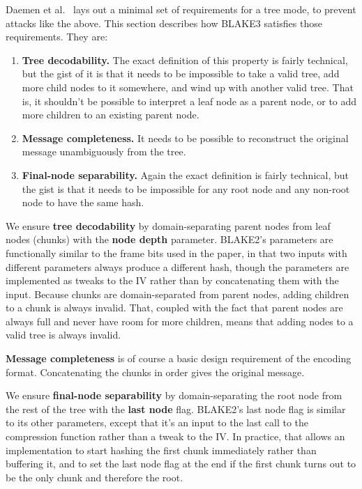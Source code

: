 \documentclass[11pt,notitlepage,a4paper]{article}
\newcommand{\name}{BLAKE3\xspace}
\begin{document}
Daemen et al.~\cite{DBLP:journals/ijisec/BertoniDPA14,DBLP:journals/tosc/DaemenMA18} lays out a minimal set of requirements for a tree mode, to prevent attacks like the above. This section describes how \name satisfies those requirements. They are:
\begin{enumerate}
\item \textbf{Tree decodability.} The exact definition of this property is fairly technical, but the gist of it is that it needs to be impossible to take a valid tree, add more child nodes to it somewhere, and wind up with another valid tree. That is, it shouldn't be possible to interpret a leaf node as a parent node, or to add more children to an existing parent node.
\item \textbf{Message completeness.} It needs to be possible to reconstruct the original message unambiguously from the tree.
\item \textbf{Final-node separability.} Again the exact definition is fairly technical, but the gist is that it needs to be impossible for any root node and any non-root node to have the same hash.
\end{enumerate}
We ensure \textbf{tree decodability} by domain-separating parent nodes from leaf nodes (chunks) with the \textbf{node depth} parameter. BLAKE2's parameters are functionally similar to the frame bits used in the paper, in that two inputs with different parameters always produce a different hash, though the parameters are implemented as tweaks to the IV rather than by concatenating them with the input. Because chunks are domain-separated from parent nodes, adding children to a chunk is always invalid. That, coupled with the fact that parent nodes are always full and never have room for more children, means that adding nodes to a valid tree is always invalid.

\textbf{Message completeness} is of course a basic design requirement of the encoding format. Concatenating the chunks in order gives the original message.

We ensure \textbf{final-node separability} by domain-separating the root node from the rest of the tree with the \textbf{last node} flag. BLAKE2's last node flag is similar to its other parameters, except that it's an input to the last call to the compression function rather than a tweak to the IV. In practice, that allows an implementation to start hashing the first chunk immediately rather than buffering it, and to set the last node flag at the end if the first chunk turns out to be the only chunk and therefore the root.
\end{document}
